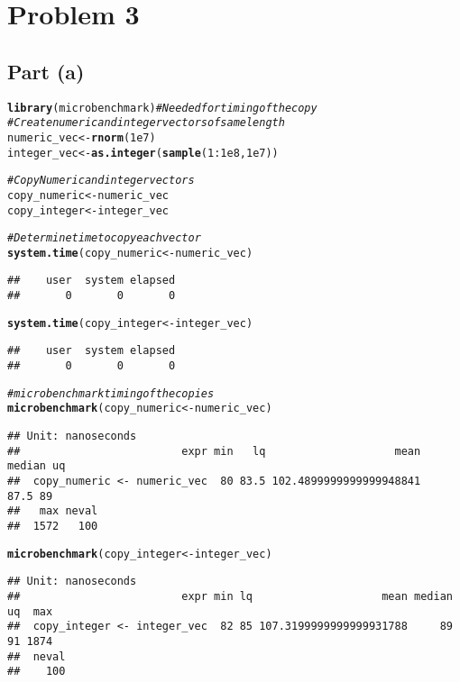 \documentclass{article}\usepackage[]{graphicx}\usepackage[]{color}
\makeatletter
\newcommand{\hlnum}[1]{\textcolor[rgb]{0.686,0.059,0.569}{#1}}%
\newcommand{\hlcom}[1]{\textcolor[rgb]{0.678,0.584,0.686}{\textit{#1}}}%
\newcommand{\hlopt}[1]{\textcolor[rgb]{0,0,0}{#1}}%
\newcommand{\hlstd}[1]{\textcolor[rgb]{0.345,0.345,0.345}{#1}}%
\newcommand{\hlkwb}[1]{\textcolor[rgb]{0.69,0.353,0.396}{#1}}%
\newcommand{\hlkwd}[1]{\textcolor[rgb]{0.737,0.353,0.396}{\textbf{#1}}}%
\newenvironment{kframe}{%
 \def\at@end@of@kframe{}%
 \ifinner\ifhmode%
  \def\at@end@of@kframe{\end{minipage}}%
  \begin{minipage}{\columnwidth}%
 \fi\fi%
 \def\FrameCommand##1{\hskip\@totalleftmargin \hskip-\fboxsep
 \colorbox{shadecolor}{##1}\hskip-\fboxsep
     \hskip-\linewidth \hskip-\@totalleftmargin \hskip\columnwidth}%
 \MakeFramed {\advance\hsize-\width
   \@totalleftmargin\z@ \linewidth\hsize
   \@setminipage}}%
 {\par\unskip\endMakeFramed%
 \at@end@of@kframe}
\newenvironment{knitrout}{}{} %
\makeatother
\begin{document}
\section{Problem 3}
\subsection{Part (a)}
\begin{knitrout}
\color{fgcolor}\begin{kframe}
\begin{alltt}
\hlkwd{library}\hlstd{(microbenchmark)} \hlcom{#Needed for timing of the copy}
\hlcom{#Create numeric and integer vectors of same length}
\hlstd{numeric_vec} \hlkwb{<-} \hlkwd{rnorm}\hlstd{(}\hlnum{1e7}\hlstd{)}
\hlstd{integer_vec} \hlkwb{<-} \hlkwd{as.integer}\hlstd{(}\hlkwd{sample}\hlstd{(}\hlnum{1}\hlopt{:}\hlnum{1e8}\hlstd{,} \hlnum{1e7}\hlstd{))}

\hlcom{#Copy Numeric and integer vectors }
\hlstd{copy_numeric} \hlkwb{<-} \hlstd{numeric_vec}
\hlstd{copy_integer} \hlkwb{<-} \hlstd{integer_vec}

\hlcom{#Determine time to copy each vector}
\hlkwd{system.time}\hlstd{(copy_numeric} \hlkwb{<-} \hlstd{numeric_vec)}
\end{alltt}
\begin{verbatim}
##    user  system elapsed 
##       0       0       0
\end{verbatim}
\begin{alltt}
\hlkwd{system.time}\hlstd{(copy_integer} \hlkwb{<-} \hlstd{integer_vec)}
\end{alltt}
\begin{verbatim}
##    user  system elapsed 
##       0       0       0
\end{verbatim}
\begin{alltt}
\hlcom{#microbenchmark timing of the copies}
\hlkwd{microbenchmark}\hlstd{(copy_numeric} \hlkwb{<-} \hlstd{numeric_vec)}
\end{alltt}
\begin{verbatim}
## Unit: nanoseconds
##                         expr min   lq                    mean median uq
##  copy_numeric <- numeric_vec  80 83.5 102.4899999999999948841   87.5 89
##   max neval
##  1572   100
\end{verbatim}
\begin{alltt}
\hlkwd{microbenchmark}\hlstd{(copy_integer} \hlkwb{<-} \hlstd{integer_vec)}
\end{alltt}
\begin{verbatim}
## Unit: nanoseconds
##                         expr min lq                    mean median uq  max
##  copy_integer <- integer_vec  82 85 107.3199999999999931788     89 91 1874
##  neval
##    100
\end{verbatim}
\end{kframe}
\end{knitrout}
\end{document}
